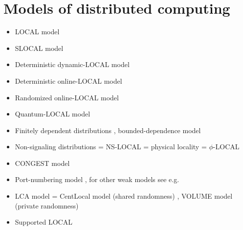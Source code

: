 \documentclass[a4paper,11pt]{article}
\begin{document}
\section{Models of distributed computing}
\begin{itemize}
    \item LOCAL model \cite{linial-1992-locality-in-distributed-graph-algorithms,peleg-2000-distributed-computing-a-locality-sensitive}
    \item SLOCAL model \cite{ghaffari-kuhn-maus-2017-on-the-complexity-of-local}
    \item Deterministic dynamic-LOCAL model \cite{akbari-eslami-etal-2023-locality-in-online-dynamic}
    \item Deterministic online-LOCAL model \cite{akbari-eslami-etal-2023-locality-in-online-dynamic}
    \item Randomized online-LOCAL model \cite{akbari-coiteux-roy-etal-2025-online-locality-meets}
    \item Quantum-LOCAL model \cite{gavoille-kosowski-markiewicz-2009-what-can-be-observed,arfaoui-fraigniaud-2014-what-can-be-computed-without}
    \item Finitely dependent distributions \cite{burton-goulet-meester-1993-on-1-dependent-processes-and,holroyd-liggett-2016-finitely-dependent-coloring}, bounded-dependence model \cite{akbari-coiteux-roy-etal-2025-online-locality-meets}
    \item Non-signaling distributions = NS-LOCAL = physical locality = $\phi$-LOCAL \cite{gavoille-kosowski-markiewicz-2009-what-can-be-observed,arfaoui-fraigniaud-2014-what-can-be-computed-without}
    \item CONGEST model \cite{peleg-2000-distributed-computing-a-locality-sensitive}
    \item Port-numbering model \cite{angluin-1980-local-and-global-properties-in-networks-of}, for other weak models see e.g.\ \cite{hella-jarvisalo-etal-2015-weak-models-of-distributed}
    \item LCA model = CentLocal model (shared randomness) \cite{rubinfeld-tamir-etal-2011-fast-local-computation}, VOLUME model (private randomness) \cite{rosenbaum-suomela-2020-seeing-far-vs-seeing-wide-volume}
    \item Supported LOCAL \cite{schmid-suomela-2013-exploiting-locality-in-distributed}
\end{itemize}
\end{document}
